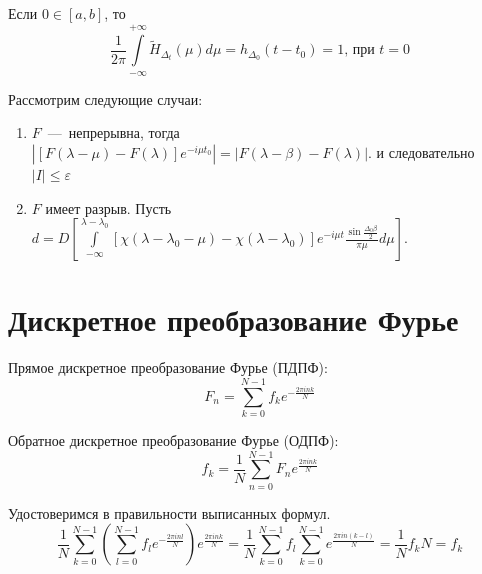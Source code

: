 Если $0 \in [a, b]$, то 
\begin{equation*}
\frac{1}{2 \pi}  \int\limits_{-\infty}^{+\infty} \widetilde{H}_{\Delta_t}(\mu) d \mu = h_{\Delta_0} (t - t_0) = 1, \, \text{при } t = 0
\end{equation*}

Рассмотрим следующие случаи:
\begin{enumerate}
\item $F$~---~непрерывна, тогда $\left| [F(\lambda - \mu) - F(\lambda)] e^{-i \mu t_0} \right| = |F(\lambda - \beta) - F(\lambda)|$. и следовательно $|I| \leq \varepsilon$
\item $F$ имеет разрыв. Пусть $d = D \left[  \int\limits_{-\infty}^{\lambda - \lambda_0} [\chi (\lambda - \lambda_0 - \mu) - \chi (\lambda - \lambda_0)] e^{-i \mu t} \frac{ \sin \frac{\Delta_0 \beta}{2}}{\pi \mu} d \mu \right]$.
\end{enumerate}

\section{Дискретное преобразование Фурье}

Прямое дискретное преобразование Фурье (ПДПФ):
\begin{equation*}
F_n = \sum\limits_{k = 0}^{N - 1} f_k e^{- \frac{2 \pi i n k}{N}}
\end{equation*}

Обратное дискретное преобразование Фурье (ОДПФ):
\begin{equation*}
f_k = \frac{1}{N} \sum\limits_{n = 0}^{N - 1} F_n e^{\frac{2 \pi i n k}{N}}
\end{equation*}

Удостоверимся в правильности выписанных формул.
\begin{equation*}
\frac{1}{N} \sum\limits_{k = 0}^{N - 1} \left( \sum\limits_{l = 0}^{N - 1} f_l e^{- \frac{2 \pi i n l}{N}} \right) e^{\frac{2 \pi i n k}{N}} = \frac{1}{N} \sum\limits_{k = 0}^{N - 1} f_l \sum\limits_{k = 0}^{N - 1} e^{\frac{2 \pi i n (k - l)}{N}} = \frac{1}{N}f_k N = f_k
\end{equation*}

